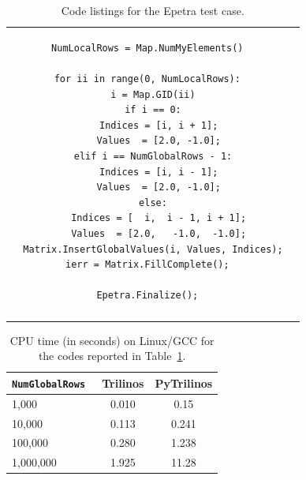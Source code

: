 \documentclass[10pt,relax]{SANDreport}
\begin{document}
\begin{table}
\begin{tabular}{| c  | c|}
\begin{minipage}{10.5cm}
\begin{verbatim}
NumLocalRows = Map.NumMyElements()

for ii in range(0, NumLocalRows):
  i = Map.GID(ii)
  if i == 0:
    Indices = [i, i + 1];
    Values  = [2.0, -1.0];
  elif i == NumGlobalRows - 1:
    Indices = [i, i - 1];
    Values  = [2.0, -1.0];
  else:
    Indices = [  i,  i - 1, i + 1];
    Values  = [2.0,   -1.0,  -1.0];
  Matrix.InsertGlobalValues(i, Values, Indices);
ierr = Matrix.FillComplete();
 
Epetra.Finalize();
\end{verbatim}
\end{minipage}
\\
&  \\
\hline
\end{tabular}
\caption{Code listings for the Epetra test case.}
\label{tab:code_epetra}
\end{table}


\begin{table}
\begin{center}
\begin{tabular}{| l | c | c |}
\hline
\tt NumGlobalRows & Trilinos & PyTrilinos \\
\hline
1,000 & 0.010 & 0.15 \\
10,000 & 0.113 & 0.241 \\
100,000 & 0.280 & 1.238 \\
1,000,000 & 1.925 & 11.28 \\
\hline
\end{tabular}
\caption{CPU time (in seconds) on Linux/GCC for the codes reported in
Table~\ref{tab:code_epetra}.}
\label{tab:time_epetra}
\end{center}
\end{table}
\end{document}
